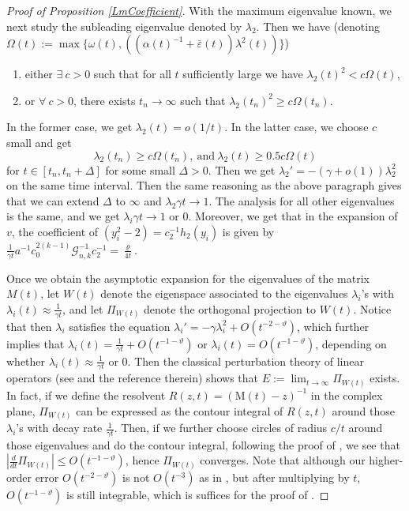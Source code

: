 \documentclass[11pt]{amsart}
\numberwithin{equation}{section}
\numberwithin{equation}{section}
\newcommand{\eps}{\varepsilon}
\newcommand{\cG}{\mathcal{G}}
\begin{document}
\begin{proof}[Proof of Proposition \ref{LmCoefficient}]
		With the maximum eigenvalue known, we next study the subleading eigenvalue denoted by $\lambda_2$.  Then 
		we have (denoting $\Omega(t):=\max\{\omega(t),((\alpha(t)^{-1}+\bar\eps(t))\lambda^2(t))\}$)
		\begin{enumerate}
			\item either $\exists\ c>0$ such that for all $t$ sufficiently large we have $\lambda_2(t)^2<c\Omega(t)$, 
			\item or $\forall\ c>0$, there exists $t_n\to\infty $ such that $\lambda_2(t_n)^2\geq c\Omega(t_n)$.
		\end{enumerate}
		In the former case, we get $\lambda_2(t)=o(1/t)$. In the latter case, we choose $c$ small and get $$\lambda_2(t_n)\geq c\Omega(t_n),\ \mathrm{and}\ \lambda_2(t)\geq 0.5c\Omega(t)$$ for $t\in [t_n,t_n+\Delta]$ for some small $\Delta>0$. Then we get
		$\lambda_2'=-(\gamma+o(1))\lambda_2^2$ on the same time interval. Then the same reasoning as the above paragraph gives that we can extend $\Delta$ to $\infty$ and  $\lambda_2\gamma t\to1.$ The analysis for all other eigenvalues is the same, and we get $\lambda_i\gamma t\to 1$ or $0.$ Moreover, we get that in the expansion of $v$, the coefficient of $(y_i^2-2)=c_2^{-1}h_2(y_i)$ is given by $\frac{1}{\gamma t}a^{-1}c_0^{2(k-1)}\cG_{n,k}^{-1}c_2^{-1}=\frac{\varrho}{4t}$.
		
		Once we obtain the asymptotic expansion for the eigenvalues of the matrix $M(t)$, let $W(t)$ denote the eigenspace associated to the eigenvalues $\lambda_i$'s with $\lambda_i(t)\approx \frac{1}{\gamma t}$, and let $\Pi_{W(t)}$ denote the orthogonal projection to $W(t)$. Notice that then $\lambda_i$ satisfies the equation $\lambda_i'=-\gamma \lambda_i^2 + O(t^{-2-\vartheta})$, which further implies that $\lambda_i(t)=\frac{1}{\gamma t}+O(t^{-1-\vartheta})$ or $\lambda_i(t)=O(t^{-1-\vartheta})$, depending on whether $\lambda_i(t)\approx \frac{1}{\gamma t}$ or $0$. Then the classical perturbation theory of linear operators (see \cite[Lemma 3.6]{V2} and the reference therein) shows that $E:=\lim_{t\to\infty}\Pi_{W(t)}$ exists. In fact, if we define the resolvent $R(z,t)=(\mathrm{M}(t)-z)^{-1}$ in the complex plane, $\Pi_{W(t)}$ can be expressed as the contour integral of $R(z,t)$ around those $\lambda_i$'s with decay rate $\frac{1}{\gamma t}$. Then, if we further choose circles of radius $c/t$ around those eigenvalues and do the contour integral, following the proof of \cite[Lemma 3.6]{V2}, we see that $\left|\frac{d}{dt}\Pi_{W(t)}\right|\leq O(t^{-1-\vartheta})$, hence $\Pi_{W(t)}$ converges. Note that although our higher-order error $O(t^{-2-\vartheta})$ is not $O(t^{-3})$ as in \cite[Lemma 3.6]{V2}, but after multiplying by $t$, $O(t^{-1-\vartheta})$ is still integrable, which is suffices for the proof of \cite[Lemma 3.6]{V2}.
		

\end{proof}
\end{document}
